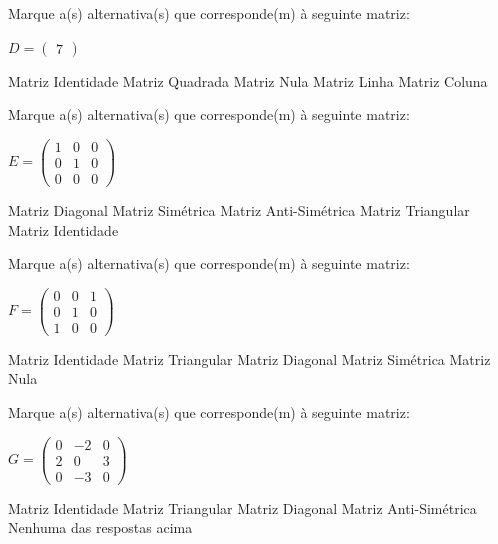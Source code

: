 \documentclass[pdftex, brazil, 12pt, oneside, addpoints, answers]{exam}
\begin{document}
\begin{questions}
\question
Marque a(s) alternativa(s) que corresponde(m) à seguinte matriz:

\hspace{5cm}$D = \begin{pmatrix}
  7
\end{pmatrix}$
\begin{checkboxes}
  \choice Matriz Identidade
  \CorrectChoice Matriz Quadrada
  \choice Matriz Nula
  \CorrectChoice Matriz Linha
  \CorrectChoice Matriz Coluna
\end{checkboxes}

\question
Marque a(s) alternativa(s) que corresponde(m) à seguinte matriz:

\hspace{5cm}$E = \begin{pmatrix}
  1 & 0 & 0\\
  0 & 1 & 0\\
  0 & 0 & 0
\end{pmatrix}$
\begin{checkboxes}
  \CorrectChoice Matriz Diagonal
  \CorrectChoice Matriz Simétrica
  \choice Matriz Anti-Simétrica
  \choice Matriz Triangular
  \choice Matriz Identidade
\end{checkboxes}

\ifprintanswers
\newpage
\fi

\question
Marque a(s) alternativa(s) que corresponde(m) à seguinte matriz:

\hspace{5cm}$F = \begin{pmatrix}
  0 & 0 & 1\\
  0 & 1 & 0\\
  1 & 0 & 0
\end{pmatrix}$
\begin{checkboxes}
  \choice Matriz Identidade
  \choice Matriz Triangular
  \choice Matriz Diagonal
  \CorrectChoice Matriz Simétrica
  \choice Matriz Nula
\end{checkboxes}

\question
Marque a(s) alternativa(s) que corresponde(m) à seguinte matriz:

\hspace{5cm}$G = \begin{pmatrix}
  0 & -2 & 0\\
  2 & 0 & 3\\
  0 & -3 & 0
\end{pmatrix}$
\begin{checkboxes}
  \choice Matriz Identidade
  \choice Matriz Triangular
  \choice Matriz Diagonal
  \CorrectChoice Matriz Anti-Simétrica
  \choice Nenhuma das respostas acima
\end{checkboxes}


\end{questions}
\end{document}
